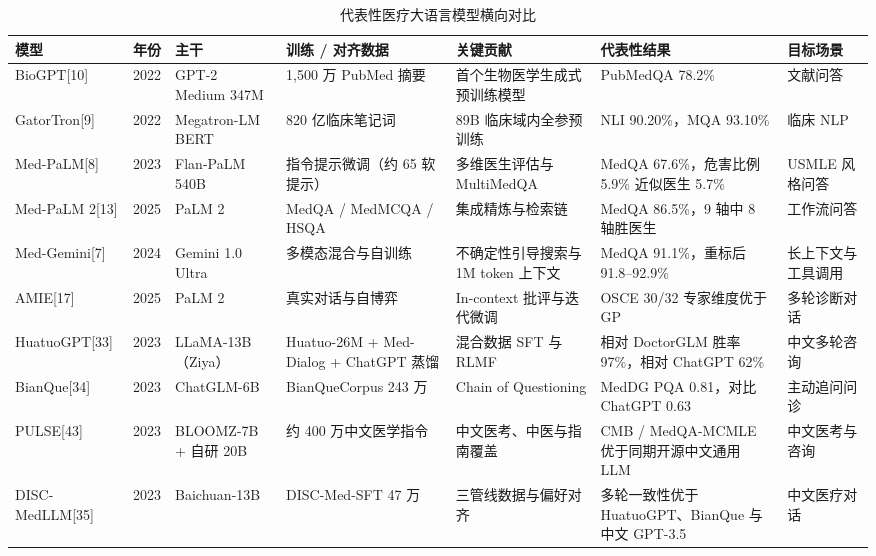 \begin{table}[htbp]
\centering
\caption{代表性医疗大语言模型横向对比}
\label{tab:llm-compare}
\scriptsize
\begin{tabularx}{\textwidth}{L{1.7cm} L{0.9cm} L{2cm} L{2.6cm} Y Y L{1.8cm}}
\toprule
模型 & 年份 & 主干 & 训练 / 对齐数据 & 关键贡献 & 代表性结果 & 目标场景 \\
\midrule
BioGPT[10] & 2022 & GPT-2 Medium 347M & 1,500 万 PubMed 摘要 & 首个生物医学生成式预训练模型 & PubMedQA 78.2\% & 文献问答 \\
GatorTron[9] & 2022 & Megatron-LM BERT & 820 亿临床笔记词 & 89B 临床域内全参预训练 & NLI 90.20\%，MQA 93.10\% & 临床 NLP \\
Med-PaLM[8] & 2023 & Flan-PaLM 540B & 指令提示微调（约 65 软提示） & 多维医生评估与 MultiMedQA & MedQA 67.6\%，危害比例 5.9\% 近似医生 5.7\% & USMLE 风格问答 \\
Med-PaLM 2[13] & 2025 & PaLM 2 & MedQA / MedMCQA / HSQA & 集成精炼与检索链 & MedQA 86.5\%，9 轴中 8 轴胜医生 & 工作流问答 \\
Med-Gemini[7] & 2024 & Gemini 1.0 Ultra & 多模态混合与自训练 & 不确定性引导搜索与 1M token 上下文 & MedQA 91.1\%，重标后 91.8--92.9\% & 长上下文与工具调用 \\
AMIE[17] & 2025 & PaLM 2 & 真实对话与自博弈 & In-context 批评与迭代微调 & OSCE 30/32 专家维度优于 GP & 多轮诊断对话 \\
HuatuoGPT[33] & 2023 & LLaMA-13B（Ziya） & Huatuo-26M + Med-Dialog + ChatGPT 蒸馏 & 混合数据 SFT 与 RLMF & 相对 DoctorGLM 胜率 97\%，相对 ChatGPT 62\% & 中文多轮咨询 \\
BianQue[34] & 2023 & ChatGLM-6B & BianQueCorpus 243 万 & Chain of Questioning & MedDG PQA 0.81，对比 ChatGPT 0.63 & 主动追问问诊 \\
PULSE[43] & 2023 & BLOOMZ-7B + 自研 20B & 约 400 万中文医学指令 & 中文医考、中医与指南覆盖 & CMB / MedQA-MCMLE 优于同期开源中文通用 LLM & 中文医考与咨询 \\
DISC-MedLLM[35] & 2023 & Baichuan-13B & DISC-Med-SFT 47 万 & 三管线数据与偏好对齐 & 多轮一致性优于 HuatuoGPT、BianQue 与中文 GPT-3.5 & 中文医疗对话 \\
\bottomrule
\end{tabularx}
\end{table}
